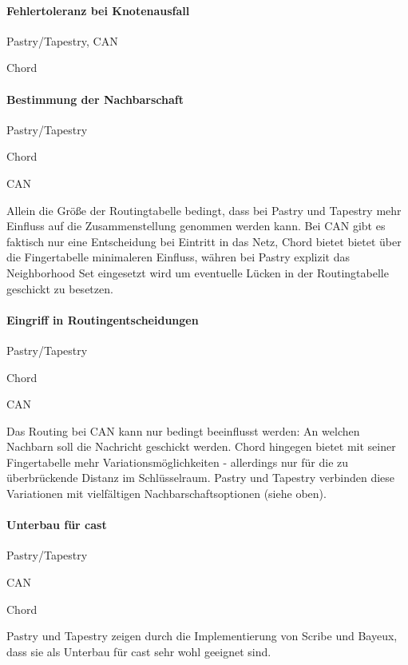 \paragraph{Fehlertoleranz bei Knotenausfall}
\begin{enumerate*}
\item Pastry/Tapestry, CAN
\item Chord
\end{enumerate*}


\paragraph{Bestimmung der Nachbarschaft}
\begin{enumerate*}
\item Pastry/Tapestry
\item Chord
\item CAN
\end{enumerate*}
Allein die Größe der Routingtabelle bedingt, dass bei Pastry und Tapestry mehr Einfluss auf die Zusammenstellung genommen werden kann. Bei CAN gibt es faktisch nur eine Entscheidung bei Eintritt in das Netz, Chord bietet bietet über die Fingertabelle minimaleren Einfluss, währen bei Pastry explizit das Neighborhood Set eingesetzt wird um eventuelle Lücken in der Routingtabelle geschickt zu besetzen.

\paragraph{Eingriff in Routingentscheidungen}
\begin{enumerate*}
\item Pastry/Tapestry
\item Chord
\item CAN
\end{enumerate*}
Das Routing bei CAN kann nur bedingt beeinflusst werden: An welchen Nachbarn soll die Nachricht geschickt werden. Chord hingegen bietet mit seiner Fingertabelle mehr Variationsmöglichkeiten - allerdings nur für die zu überbrückende Distanz im Schlüsselraum. Pastry und Tapestry verbinden diese Variationen mit vielfältigen Nachbarschaftsoptionen (siehe oben).

\paragraph{Unterbau für \ac{cast}}
\begin{enumerate*}
\item Pastry/Tapestry
\item CAN
\item Chord
\end{enumerate*}
Pastry und Tapestry zeigen durch die Implementierung von Scribe und Bayeux, dass sie als Unterbau für \ac{cast} sehr wohl geeignet sind.

